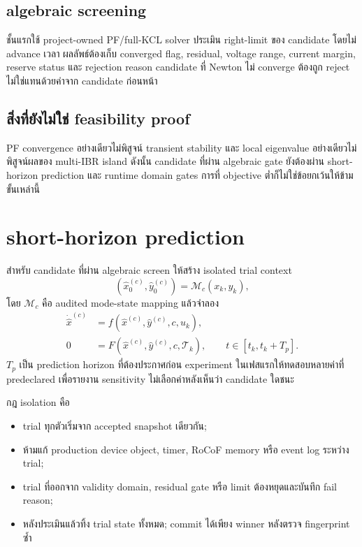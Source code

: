 \documentclass[12pt,a4paper]{article}
\begin{document}
\subsection{algebraic screening}

ชั้นแรกใช้ project-owned PF/full-KCL solver ประเมิน right-limit ของ candidate โดยไม่ advance เวลา
ผลลัพธ์ต้องเก็บ converged flag, residual, voltage range, current margin, reserve status และ rejection reason
candidate ที่ Newton ไม่ converge ต้องถูก reject ไม่ใช่แทนด้วยค่าจาก candidate ก่อนหน้า

\subsection{สิ่งที่ยังไม่ใช่ feasibility proof}

PF convergence อย่างเดียวไม่พิสูจน์ transient stability และ local eigenvalue อย่างเดียวไม่พิสูจน์ผลของ
multi-IBR island ดังนั้น candidate ที่ผ่าน algebraic gate ยังต้องผ่าน short-horizon prediction และ runtime
domain gates การที่ objective ต่ำก็ไม่ใช่ข้อยกเว้นให้ข้ามขั้นเหล่านี้

\section{short-horizon prediction}

สำหรับ candidate ที่ผ่าน algebraic screen ให้สร้าง isolated trial context
\begin{equation}
(\hat x_0^{(c)},\hat y_0^{(c)})=\mathcal M_c(x_k,y_k),
\end{equation}
โดย $\mathcal M_c$ คือ audited mode-state mapping แล้วจำลอง
\begin{align}
\dot{\hat x}^{(c)} &= f(\hat x^{(c)},\hat y^{(c)},c,u_k),\\
0 &= F(\hat x^{(c)},\hat y^{(c)},c,\mathcal T_k),
\qquad t\in[t_k,t_k+T_p].
\end{align}
$T_p$ เป็น prediction horizon ที่ต้องประกาศก่อน experiment ในเฟสแรกให้ทดสอบหลายค่าที่ predeclared
เพื่อรายงาน sensitivity ไม่เลือกค่าหลังเห็นว่า candidate ใดชนะ

กฎ isolation คือ
\begin{itemize}
  \item trial ทุกตัวเริ่มจาก accepted snapshot เดียวกัน;
  \item ห้ามแก้ production device object, timer, RoCoF memory หรือ event log ระหว่าง trial;
  \item trial ที่ออกจาก validity domain, residual gate หรือ limit ต้องหยุดและบันทึก fail reason;
  \item หลังประเมินแล้วทิ้ง trial state ทั้งหมด; commit ได้เพียง winner หลังตรวจ fingerprint ซ้ำ
\end{itemize}
\end{document}
